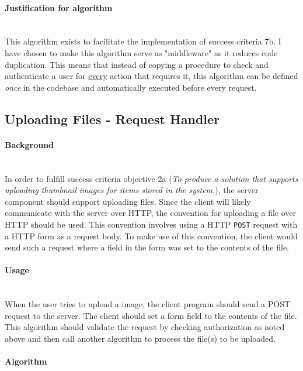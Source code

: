 \documentclass[../../main.tex]{subfiles}
\begin{document}
\paragraph{Justification for algorithm}

\noindent \\ This algorithm exists to facilitate the implementation of success criteria 7b. I have chosen
to make this algorithm serve as "middleware" as it reduces code duplication. This means that instead of copying
a procedure to check and authenticate a user for \underline{every} action that requires it, this algorithm
can be defined \textit{once} in the codebase and automatically executed before every request.

\pagebreak

\subsection{Uploading Files - Request Handler}

\paragraph{Background}

\noindent \\ In order to fulfill success criteria objective 2a (\textit{To produce a solution that supports
    uploading thumbnail images for items stored in the system.}), the server component should support uploading
files. Since the client will likely communicate with the server over HTTP, the convention for uploading a file
over HTTP should be used. This convention involves using a HTTP \lstinline{POST} request with a HTTP form as
a request body. To make use of this convention, the client would send such a request where a field in the form
was set to the contents of the file.

\paragraph{Usage}

\noindent \\ When the user tries to upload a image, the client program should send a POST request to the
server. The client should set a form field to the contents of the file. This algorithm should validate the
request by checking authorization as noted above and then call another algorithm to process the file(s) to
be uploaded.

\paragraph{Algorithm}
\end{document}
